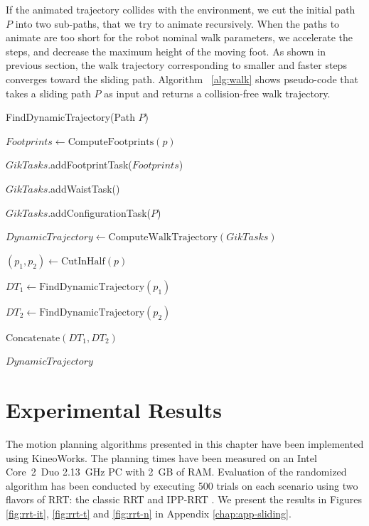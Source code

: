 If the animated  trajectory collides with the environment,  we cut the
initial  path   $P$  into  two   sub-paths,  that  we  try   to  animate
recursively. When the  paths to animate are too  short for the robot
nominal  walk parameters, we  accelerate the  steps, and  decrease the
maximum height of  the moving foot. As shown  in previous section, the
walk trajectory  corresponding to  smaller and faster  steps converges
toward the  sliding path.  Algorithm ~\ref{alg:walk} shows pseudo-code
that takes  a sliding path $P$  as input and  returns a collision-free
walk trajectory.

\begin{algorithm}
\caption{FindDynamicTrajectory(Path $P$)}
\label{alg:walk}
\begin{algorithmic}
\STATE $Footprints \leftarrow \text{ComputeFootprints}(p)$

\STATE $GikTasks$.addFootprintTask($Footprints$)

\STATE $GikTasks$.addWaistTask()

\STATE $GikTasks$.addConfigurationTask($P$)

\STATE $DynamicTrajectory \leftarrow
\text{ComputeWalkTrajectory}(GikTasks)$


\STATE $(p_1,p_2) \leftarrow \text{CutInHalf}(p)$

\STATE $DT_1 \leftarrow \text{FindDynamicTrajectory}(p_1)$

\STATE $DT_2 \leftarrow \text{FindDynamicTrajectory}(p_2)$

\RETURN $\text{Concatenate}(DT_1,DT_2)$

\ELSE

\RETURN $DynamicTrajectory$

\ENDIF
\end{algorithmic}
\end{algorithm}

\section{Experimental Results}

\label{sec:exp}

The motion planning algorithms presented in this chapter have been
implemented using KineoWorks\texttrademark \cite{laumond2006kcs}. The
planning times have been measured on an Intel Core~2~Duo 2.13~GHz PC
with 2~GB of RAM. Evaluation of the randomized algorithm has been
conducted by executing 500 trials on each scenario using two flavors
of RRT: the classic RRT and IPP-RRT \cite{FERR04A}. We present the
results in Figures \ref{fig:rrt-it}, \ref{fig:rrt-t} and \ref{fig:rrt-n}
in Appendix \ref{chap:app-sliding}.

